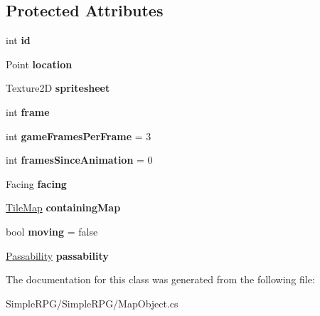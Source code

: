 \subsection*{Protected Attributes}
\begin{DoxyCompactItemize}
\item 
\hypertarget{class_simple_r_p_g_1_1_map_object_ae014494246731c8ab9dc257ce4f2014f}{int {\bfseries id}}\label{class_simple_r_p_g_1_1_map_object_ae014494246731c8ab9dc257ce4f2014f}

\item 
\hypertarget{class_simple_r_p_g_1_1_map_object_abadd8bb893f7105e5d58914377da004b}{Point {\bfseries location}}\label{class_simple_r_p_g_1_1_map_object_abadd8bb893f7105e5d58914377da004b}

\item 
\hypertarget{class_simple_r_p_g_1_1_map_object_a74de510fc5519cc030fbd40278b3055b}{Texture2\-D {\bfseries spritesheet}}\label{class_simple_r_p_g_1_1_map_object_a74de510fc5519cc030fbd40278b3055b}

\item 
\hypertarget{class_simple_r_p_g_1_1_map_object_af2cc5123349a39665908ae723499dc89}{int {\bfseries frame}}\label{class_simple_r_p_g_1_1_map_object_af2cc5123349a39665908ae723499dc89}

\item 
\hypertarget{class_simple_r_p_g_1_1_map_object_a2f5dd4ec31a9caa81a54f7897ebbc4c7}{int {\bfseries game\-Frames\-Per\-Frame} = 3}\label{class_simple_r_p_g_1_1_map_object_a2f5dd4ec31a9caa81a54f7897ebbc4c7}

\item 
\hypertarget{class_simple_r_p_g_1_1_map_object_a8400e2878a7be96b986b3cb9c4540e25}{int {\bfseries frames\-Since\-Animation} = 0}\label{class_simple_r_p_g_1_1_map_object_a8400e2878a7be96b986b3cb9c4540e25}

\item 
\hypertarget{class_simple_r_p_g_1_1_map_object_acd8ae5f5cec25d5d2c5b8007204f2f2f}{Facing {\bfseries facing}}\label{class_simple_r_p_g_1_1_map_object_acd8ae5f5cec25d5d2c5b8007204f2f2f}

\item 
\hypertarget{class_simple_r_p_g_1_1_map_object_a80ed5dceff7ef41541cd975a55a52b01}{\hyperlink{class_simple_r_p_g_1_1_tile_map}{Tile\-Map} {\bfseries containing\-Map}}\label{class_simple_r_p_g_1_1_map_object_a80ed5dceff7ef41541cd975a55a52b01}

\item 
\hypertarget{class_simple_r_p_g_1_1_map_object_a96cebab1a15feda253342be768c52343}{bool {\bfseries moving} = false}\label{class_simple_r_p_g_1_1_map_object_a96cebab1a15feda253342be768c52343}

\item 
\hypertarget{class_simple_r_p_g_1_1_map_object_aa03f7e7baaec7a1076771ceed3d4ae70}{\hyperlink{namespace_simple_r_p_g_a5f1ec21e7f4e36278a6cedd38c51e650}{Passability} {\bfseries passability}}\label{class_simple_r_p_g_1_1_map_object_aa03f7e7baaec7a1076771ceed3d4ae70}

\end{DoxyCompactItemize}


The documentation for this class was generated from the following file\-:\begin{DoxyCompactItemize}
\item 
Simple\-R\-P\-G/\-Simple\-R\-P\-G/Map\-Object.\-cs\end{DoxyCompactItemize}
